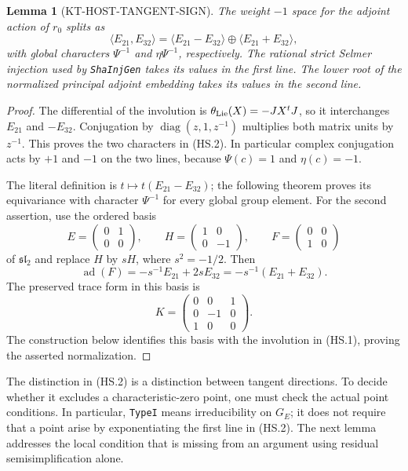 \documentclass[11pt,a4paper]{article}
\newtheorem{lemma}[theorem]{Lemma}
\theoremstyle{definition}
\begin{document}
\begin{lemma}[KT-HOST-TANGENT-SIGN]
The weight $-1$ space for the adjoint action of $r_0$ splits as
\[
 \langle E_{21},E_{32}\rangle
  =\langle E_{21}-E_{32}\rangle
       \oplus\langle E_{21}+E_{32}\rangle,
                                                               \tag{HS.2}
\]
with global characters $\Psi^{-1}$ and $\eta\Psi^{-1}$,
respectively.  The rational strict Selmer injection used by
\texttt{ShaInjGen} takes its values in the first line.  The lower
root of the normalized principal adjoint embedding takes its values
in the second line.
\end{lemma}
\begin{proof}
The differential of the involution is
$\theta_{\rm Lie}(X)=-JX^tJ$, so it interchanges
$E_{21}$ and $-E_{32}$.  Conjugation by
$\operatorname{diag}(z,1,z^{-1})$ multiplies both matrix units
by $z^{-1}$.  This proves the two characters in (HS.2).
In particular complex conjugation acts by $+1$ and $-1$ on
the two lines, because $\Psi(c)=1$ and $\eta(c)=-1$.

The literal definition  is
$t\mapsto t(E_{21}-E_{32})$; the following theorem
 proves its equivariance with character
$\Psi^{-1}$ for every global group element.
For the second assertion, use the ordered basis
\[
 E=\begin{pmatrix}0&1\\0&0\end{pmatrix},\qquad
 H=\begin{pmatrix}1&0\\0&-1\end{pmatrix},\qquad
 F=\begin{pmatrix}0&0\\1&0\end{pmatrix}
\]
of $\mathfrak{sl}_2$ and replace $H$ by $sH$, where
$s^2=-1/2$.  Then
\[
 \operatorname{ad}(F)=-s^{-1}E_{21}+2sE_{32}
                  =-s^{-1}(E_{21}+E_{32}).                    \tag{HS.3}
\]
The preserved trace form in this basis is
\[
 K=\begin{pmatrix}0&0&1\\0&-1&0\\1&0&0\end{pmatrix}.
                                                               \tag{HS.4}
\]
The construction below identifies this basis with the involution
in (HS.1), proving the asserted normalization.
\end{proof}

The distinction in (HS.2) is a distinction between tangent
directions.  To decide whether it excludes a characteristic-zero
point, one must check the actual point conditions.  In particular,
\texttt{TypeI} means irreducibility on $G_E$; it does not require
that a point arise by exponentiating the first line in (HS.2).
The next lemma addresses the local condition that is missing from
an argument using residual semisimplification alone.
\end{document}

